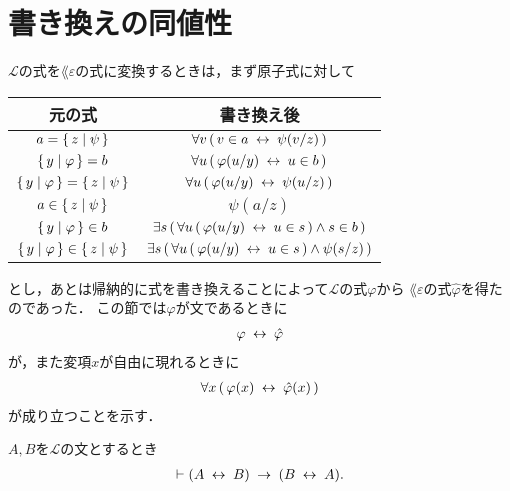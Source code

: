 \section{書き換えの同値性}
	
	$\mathcal{L}$の式を$\lang{\varepsilon}$の式に変換するときは，まず原子式に対して
	\begin{table}[h]
		\begin{center}
		\begin{tabular}{c|c}
			元の式 & 書き換え後 \\ \hline \hline
			$a = \left\{\, z \mid \psi\, \right\}$ & $\forall v\, (\, v \in a \hspace{0.25em}\leftrightarrow\hspace{0.25em} \psi(v/z)\, )$ \\ \hline
			$\left\{\, y \mid \varphi\, \right\} = b$ & $\forall u\, (\, \varphi(u/y) \hspace{0.25em}\leftrightarrow\hspace{0.25em} u \in b\, )$ \\ \hline
			$\left\{\, y \mid \varphi\, \right\} = \left\{\, z \mid \psi\, \right\}$ & $\forall u\, (\, \varphi(u/y) \hspace{0.25em}\leftrightarrow\hspace{0.25em} \psi(u/z)\, )$ \\ \hline
			$a \in \left\{\, z \mid \psi\, \right\}$ & $\psi(a/z)$ \\ \hline
			$\left\{\, y \mid \varphi\, \right\} \in b$ & $\exists s\, (\, \forall u\, (\, \varphi(u/y) \hspace{0.25em}\leftrightarrow\hspace{0.25em} u \in s\, ) \wedge s \in b\, )$ \\ \hline
			$\left\{\, y \mid \varphi\, \right\} \in \left\{\, z \mid \psi\, \right\}$ & $\exists s\, (\, \forall u\, (\, \varphi(u/y) \hspace{0.25em}\leftrightarrow\hspace{0.25em} u \in s\, ) \wedge \psi(s/z)\, )$ \\ \hline
		\end{tabular}
		\end{center}
	\end{table}
	
	とし，あとは帰納的に式を書き換えることによって$\mathcal{L}$の式$\varphi$から
	$\lang{\varepsilon}$の式$\hat{\varphi}$を得たのであった．
	この節では$\varphi$が文であるときに
	\begin{align}
		\varphi \hspace{0.25em}\leftrightarrow\hspace{0.25em} \hat{\varphi}
	\end{align}
	が，また変項$x$が自由に現れるときに
	\begin{align}
		\forall x\, (\, \varphi(x) \hspace{0.25em}\leftrightarrow\hspace{0.25em} \hat{\varphi}(x)\, )
	\end{align}
	が成り立つことを示す．
	
	\begin{screen}
		\begin{logicalthm}[同値記号の対称律]
		\label{logicalthm:symmetry_of_equivalence_arrows}
			$A,B$を$\mathcal{L}$の文とするとき
			\begin{align}
				\vdash (A \hspace{0.25em}\leftrightarrow\hspace{0.25em} B) \hspace{0.25em}\rightarrow\hspace{0.25em} (B \hspace{0.25em}\leftrightarrow\hspace{0.25em} A).
			\end{align}
		\end{logicalthm}
	\end{screen}
	
